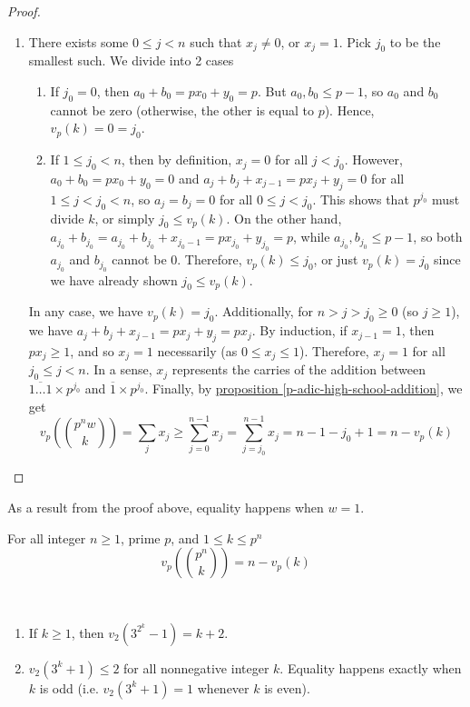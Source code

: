 \documentclass{treatise}
\begin{document}
\begin{proof}
\begin{enumerate}
\begin{enumerate}
		\item There exists some $0 \leq j < n$ such that $x_j \neq 0$, or $x_j = 1$. Pick $j_0$ to be the smallest such. We divide into 2 cases
		\begin{enumerate}
			\item If $j_0 = 0$, then $a_0 + b_0 = p x_0 + y_0 = p$. But $a_0, b_0 \leq p - 1$, so $a_0$ and $b_0$ cannot be zero (otherwise, the other is equal to $p$). Hence, $v_p (k) = 0 = j_0$.
			\item If $1 \leq j_0 < n$, then by definition, $x_j = 0$ for all $j < j_0$. However, $a_0 + b_0 = p x_0 + y_0 = 0$ and $a_j + b_j + x_{j - 1} = p x_j + y_j = 0$ for all $1 \leq j < j_0 < n$, so $a_j = b_j = 0$ for all $0 \leq j < j_0$. This shows that $p^{j_0}$ must divide $k$, or simply $j_0 \leq v_p (k)$. On the other hand, $a_{j_0} + b_{j_0} = a_{j_0} + b_{j_0} + x_{j_0 - 1} = p x_{j_0} + y_{j_0} = p$, while $a_{j_0}, b_{j_0} \leq p - 1$, so both $a_{j_0}$ and $b_{j_0}$ cannot be $0$. Therefore, $v_p (k) \leq j_0$, or just $v_p(k) = j_0$ since we have already shown $j_0 \leq v_p (k)$.
		\end{enumerate}
		In any case, we have $v_p (k) = j_0$. Additionally, for $n > j > j_0 \geq 0$ (so $j \geq 1$), we have $a_j + b_j + x_{j - 1} = p x_j + y_j = p x_j$. By induction, if $x_{j - 1} = 1$, then $p x_j \geq 1$, and so $x_j = 1$ necessarily (as $0 \leq x_j \leq 1$). Therefore, $x_j = 1$ for all $j_0 \leq j < n$. In a sense, $x_j$ represents the carries of the addition between $\overline{1 \hdots 1} \times p^{j_0}$ and $\overline{1} \times p^{j_0}$. Finally, by \hyperref[p-adic-high-school-addition]{proposition \ref*{p-adic-high-school-addition}}, we get
		$$v_p \left( {p^n w \choose k} \right) = \sum_j x_j \geq \sum_{j = 0}^{n - 1} x_j = \sum_{j = j_0}^{n - 1} x_j = n - 1 - j_0 + 1 = n - v_p (k)$$
	\end{enumerate}
\end{enumerate}
\end{proof}
As a result from the proof above, equality happens when $w = 1$.
\begin{proposition} \label{val-bino-prime-pow-eq}
For all integer $n \geq 1$, prime $p$, and $1 \leq k \leq p^n$
$$v_p \left( {p^n \choose k} \right) = n - v_p (k)$$
\end{proposition}
\begin{lemma} \label{2-3-LTE} \ 
\begin{enumerate}
	\item If $k \geq 1$, then $v_2 \left( 3^{2^k} - 1 \right) = k + 2$.
	\item $v_2 (3^k + 1) \leq 2$ for all nonnegative integer $k$. Equality happens exactly when $k$ is odd (i.e. $v_2 (3^k + 1) = 1$ whenever $k$ is even).
\end{enumerate}
\end{lemma}
\end{document}
